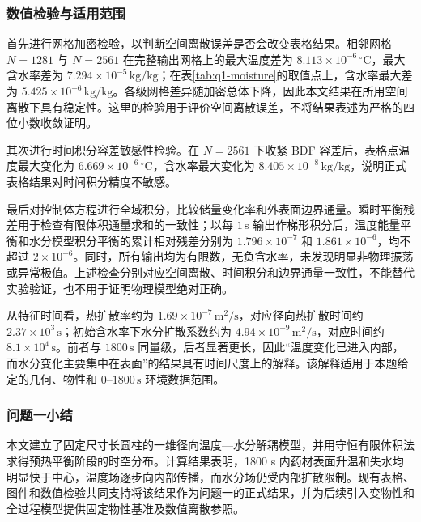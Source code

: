 \subsubsection{数值检验与适用范围}

首先进行网格加密检验，以判断空间离散误差是否会改变表格结果。相邻网格 $N=1281$ 与 $N=2561$ 在完整输出网格上的最大温度差为 $8.113\times10^{-6}\,{}^\circ\mathrm{C}$，最大含水率差为 $7.294\times10^{-5}\,\mathrm{kg/kg}$；在表\ref{tab:q1-moisture}的取值点上，含水率最大差为 $5.425\times10^{-6}\,\mathrm{kg/kg}$。各级网格差异随加密总体下降，因此本文结果在所用空间离散下具有稳定性。这里的检验用于评价空间离散误差，不将结果表述为严格的四位小数收敛证明。

其次进行时间积分容差敏感性检验。在 $N=2561$ 下收紧 BDF 容差后，表格点温度最大变化为 $6.669\times10^{-6}\,{}^\circ\mathrm{C}$，含水率最大变化为 $8.405\times10^{-8}\,\mathrm{kg/kg}$，说明正式表格结果对时间积分精度不敏感。

最后对控制体方程进行全域积分，比较储量变化率和外表面边界通量。瞬时平衡残差用于检查有限体积通量求和的一致性；以每 $1\,\mathrm{s}$ 输出作梯形积分后，温度能量平衡和水分模型积分平衡的累计相对残差分别为 $1.796\times10^{-7}$ 和 $1.861\times10^{-6}$，均不超过 $2\times10^{-6}$。同时，所有输出均为有限数，无负含水率，未发现明显非物理振荡或异常极值。上述检查分别对应空间离散、时间积分和边界通量一致性，不能替代实验验证，也不用于证明物理模型绝对正确。

从特征时间看，热扩散率约为 $1.69\times10^{-7}\,\mathrm{m^2/s}$，对应径向热扩散时间约 $2.37\times10^3\,\mathrm{s}$；初始含水率下水分扩散系数约为 $4.94\times10^{-9}\,\mathrm{m^2/s}$，对应时间约 $8.1\times10^4\,\mathrm{s}$。前者与 $1800\,\mathrm{s}$ 同量级，后者显著更长，因此“温度变化已进入内部，而水分变化主要集中在表面”的结果具有时间尺度上的解释。该解释适用于本题给定的几何、物性和 $0$--$1800\,\mathrm{s}$ 环境数据范围。

\subsubsection{问题一小结}

本文建立了固定尺寸长圆柱的一维径向温度—水分解耦模型，并用守恒有限体积法求得预热平衡阶段的时空分布。计算结果表明，1800 s 内药材表面升温和失水均明显快于中心，温度场逐步向内部传播，而水分场仍受内部扩散限制。现有表格、图件和数值检验共同支持将该结果作为问题一的正式结果，并为后续引入变物性和全过程模型提供固定物性基准及数值离散参照。
